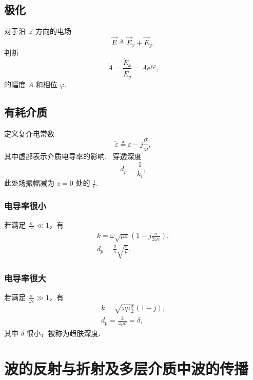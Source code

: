 \documentclass[Chinese, use boldface, twocolumn]{lebhart}
\numberwithin{equation}{section}
\begin{document}
\subsection{极化}
对于沿 $\vec{z}$ 方向的电场
\begin{equation}
  \vec{E}\triangleq\vec{E}_x+\vec{E}_y,
\end{equation}
判断
\begin{equation}
  \dot{A}=\frac{\dot{E}_x}{\dot{E}_y}=Ae^{j\varphi},
\end{equation}
的幅度 $A$ 和相位 $\varphi$.

\subsection{有耗介质}

定义复介电常数
\begin{equation}
  \widetilde{\varepsilon}\triangleq\varepsilon-j\frac{\sigma}{\omega},
\end{equation}
其中虚部表示介质电导率的影响.\ %
穿透深度
\begin{equation}
  d_p=\frac1{k_i},
\end{equation}
此处场振幅减为 $z=0$ 处的 $\frac1e$.

\subsubsection{电导率很小}
若满足 $\frac{\sigma}{\omega\varepsilon}\ll1$，有
\begin{gather}
  k=\omega\sqrt{\mu\varepsilon}\left(1-j\frac{\sigma}{2\omega\varepsilon}\right),\\
  d_p=\frac2\sigma\sqrt{\frac\varepsilon\mu}.
\end{gather}

\subsubsection{电导率很大}
若满足 $\frac{\sigma}{\omega\varepsilon}\gg1$，有
\begin{gather}
  k=\sqrt{\omega\mu\frac\sigma2}(1-j),\\
  d_p=\frac{2}{\omega\mu\sigma}=\delta,
\end{gather}
其中 $\delta$ 很小，被称为趋肤深度.

\section{波的反射与折射及多层介质中波的传播}
\end{document}
